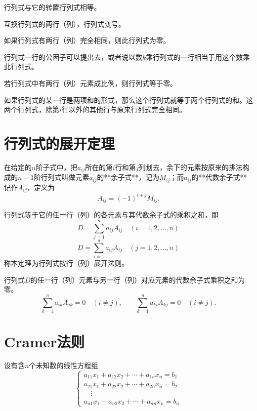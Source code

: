 \begin{property}
行列式与它的转置行列式相等。
\end{property}

\begin{property}
互换行列式的两行（列），行列式变号。
\end{property}

\begin{corollary}
如果行列式有两行（列）完全相同，则此行列式为零。
\end{corollary}

\begin{property}
行列式一行的公因子可以提出去，或者说以数$k$乘行列式的一行相当于用这个数乘此行列式。
\end{property}

\begin{corollary}
若行列式中有两行（列）元素成比例，则行列式等于零。
\end{corollary}

\begin{property}
如果行列式的某一行是两项和的形式，那么这个行列式就等于两个行列式的和。这两个行列式，除第$i$行以外的其他行与原来行列式完全相同。
\end{property}


\section{行列式的展开定理}

在给定的$n$阶子式中，把$a_{ij}$所在的第$i$行和第$j$列划去，余下的元素按原来的排法构成的$n-1$阶行列式叫做元素$a_{ij}$的**余子式**，记为$M_{ij}$；而$a_{ij}$的**代数余子式**记作$A_{ij}$，定义为
\[
A_{ij}=(-1)^{i+j}M_{ij}.
\]


\begin{theorem}
行列式等于它的任一行（列）的各元素与其代数余子式的乘积之和，即
\[
D=\sum_{j=1}^{n}a_{ij}A_{ij}\quad(i=1,2,\dots,n)
\]
\[
D=\sum_{i=1}^{n}a_{ij}A_{ij}\quad(j=1,2,\dots,n)
\]
称本定理为行列式按行（列）展开法则。
\end{theorem}

\begin{theorem}
行列式$D$的任一行（列）元素与另一行（列）对应元素的代数余子式乘积之和为零。
\[
\sum_{k=1}^{n}a_{ik}A_{jk}=0\quad(i\neq j),\qquad
\sum_{k=1}^{n}a_{ki}A_{kj}=0\quad(i\neq j).
\]
\end{theorem}


\section{Cramer法则}

设有含$n$个未知数的线性方程组
\[
\begin{cases}
a_{11}x_1+a_{12}x_2+\cdots+a_{1n}x_n=b_1\\
a_{21}x_1+a_{22}x_2+\cdots+a_{2n}x_n=b_2\\
\quad\vdots\\
a_{n1}x_1+a_{n2}x_2+\cdots+a_{nn}x_n=b_n
\end{cases}
\]
